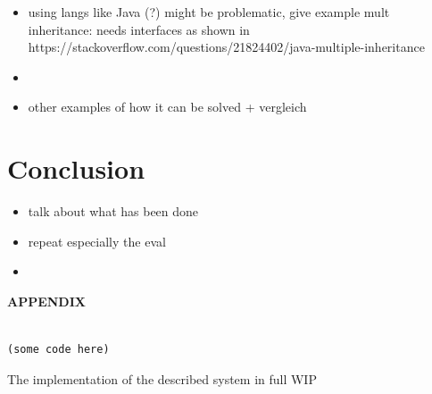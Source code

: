 \documentclass[oribibl]{llncs}
\begin{document}
\begin{itemize}
\item using langs like Java (?) might be problematic, give example mult inheritance: needs interfaces as shown in https://stackoverflow.com/questions/21824402/java-multiple-inheritance
\item 
\item other examples of how it can be solved + vergleich
\end{itemize}


\section{Conclusion}
\label{sec:conclusion}

\begin{itemize}
\item talk about what has been done
\item repeat especially the eval
\item  
\end{itemize} 

\newpage
\nocite{*}



\newpage
    \begin{center}
      {\bf APPENDIX}
    \end{center}
\label{sec:appendix}

\begin{listing}[]%
\begin{verbatim}

(some code here)

\end{verbatim}
\caption{The implementation of the described system in full WIP}
\label{lst:entire-implementation}
\end{listing}
\end{document}
